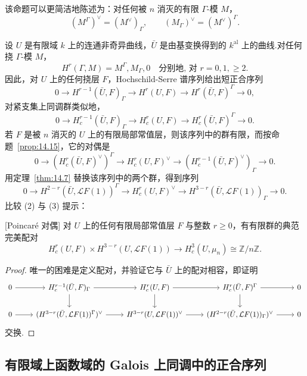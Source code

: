 该命题可以更简洁地陈述为：对任何被 $n$ 消灭的有限 $\Gamma$-模 $M$，
\[
(M^{\Gamma})^{\vee} = (M^{\vee})_{\Gamma}, \qquad (M_{\Gamma})^{\vee} = (M^{\vee})^{\Gamma}.
\]

设 $U$ 是有限域 $k$ 上的连通非奇异曲线，$\bar{U}$ 是由基变换得到的 $k^{\mathrm{al}}$ 上的曲线.对任何挠 $\Gamma$-模 $M$，
\[
H^{r}(\Gamma, M) = M^{\Gamma}, M_{\Gamma}, 0 \quad \text{分别地, 对 } r = 0, 1, \geq 2.
\]
因此，对 $U$ 上的任何挠层 $F$，Hochschild-Serre 谱序列给出短正合序列
\begin{equation}
0 \to H^{r-1}(\bar{U}, F)_{\Gamma} \to H^{r}(U, F) \to H^{r}(\bar{U}, F)^{\Gamma} \to 0, \tag{2}
\end{equation}
对紧支集上同调群类似地，
\[
0 \to H^{r-1}_{c}(\bar{U}, F)_{\Gamma} \to H^{r}_{c}(U, F) \to H^{r}_{c}(\bar{U}, F)^{\Gamma} \to 0.
\]
若 $F$ 是被 $n$ 消灭的 $U$ 上的有限局部常值层，则该序列中的群有限，而按命题~\ref{prop:14.15}，它的对偶是
\[
0 \to (H^{r}_{c}(\bar{U}, F)^{\vee})^{\Gamma} \to H^{r}_{c}(U, F)^{\vee} \to (H^{r-1}_{c}(\bar{U}, F)^{\vee})_{\Gamma} \to 0.
\]
用定理~\ref{thm:14.7} 替换该序列中的两个群，得到序列
\begin{equation}
0 \to H^{2-r}(\bar{U}, \mathcal{L}F(1))^{\Gamma} \to H^{r}_{c}(U, F)^{\vee} \to H^{3-r}(\bar{U}, \mathcal{L}F(1))_{\Gamma} \to 0. \tag{3}
\end{equation}
比较 (2) 与 (3) 提示：

\begin{theorem}\label{thm:14.16}[Poincar\'e 对偶]
对 $U$ 上的任何有限局部常值层 $F$ 与整数 $r \geq 0$，有有限群的典范完美配对
\[
H^{r}_{c}(U, F) \times H^{3-r}(U, \mathcal{L}F(1)) \to H^{3}_{c}(U, \mu_n) \cong \mathbb{Z}/n\mathbb{Z}.
\]
\end{theorem}

\begin{proof}
唯一的困难是定义配对，并验证它与 $\bar{U}$ 上的配对相容，即证明
\[
\begin{tikzcd}
0 \arrow[r] & H^{r-1}_{c}(\bar{U}, F)_{\Gamma} \arrow[r] \arrow[d] & H^{r}_{c}(U, F) \arrow[r] \arrow[d] & H^{r}_{c}(\bar{U}, F)^{\Gamma} \arrow[r] \arrow[d] & 0 \\
0 \arrow[r] & (H^{3-r}(\bar{U}, \mathcal{L}F(1))^{\Gamma})^{\vee} \arrow[r] & H^{3-r}(U, \mathcal{L}F(1))^{\vee} \arrow[r] & (H^{2-r}(\bar{U}, \mathcal{L}F(1))_{\Gamma})^{\vee} \arrow[r] & 0
\end{tikzcd}
\]
交换.
\end{proof}

\subsection*{有限域上函数域的 Galois 上同调中的正合序列}

